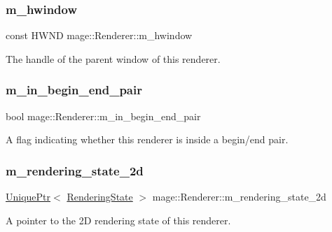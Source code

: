 \subsubsection{\texorpdfstring{m\+\_\+hwindow}{m\_hwindow}}
{\footnotesize\ttfamily const H\+W\+ND mage\+::\+Renderer\+::m\+\_\+hwindow\hspace{0.3cm}{\ttfamily [private]}}

The handle of the parent window of this renderer. \hypertarget{classmage_1_1_renderer_a3caa1bad6cbfde8f87f807e5c97924e3}{}\label{classmage_1_1_renderer_a3caa1bad6cbfde8f87f807e5c97924e3} 
\subsubsection{\texorpdfstring{m\+\_\+in\+\_\+begin\+\_\+end\+\_\+pair}{m\_in\_begin\_end\_pair}}
{\footnotesize\ttfamily bool mage\+::\+Renderer\+::m\+\_\+in\+\_\+begin\+\_\+end\+\_\+pair\hspace{0.3cm}{\ttfamily [private]}}

A flag indicating whether this renderer is inside a begin/end pair. \hypertarget{classmage_1_1_renderer_ab55bf9fc3a357358d07419ec25dbe510}{}\label{classmage_1_1_renderer_ab55bf9fc3a357358d07419ec25dbe510} 
\subsubsection{\texorpdfstring{m\+\_\+rendering\+\_\+state\+\_\+2d}{m\_rendering\_state\_2d}}
{\footnotesize\ttfamily \hyperlink{namespacemage_a3316d7143a973e37adf1110f2e80ca31}{Unique\+Ptr}$<$ \hyperlink{structmage_1_1_rendering_state}{Rendering\+State} $>$ mage\+::\+Renderer\+::m\+\_\+rendering\+\_\+state\+\_\+2d\hspace{0.3cm}{\ttfamily [private]}}

A pointer to the 2D rendering state of this renderer. \hypertarget{classmage_1_1_renderer_adf94d97911e24a3f712b294967666014}{}\label{classmage_1_1_renderer_adf94d97911e24a3f712b294967666014} 
